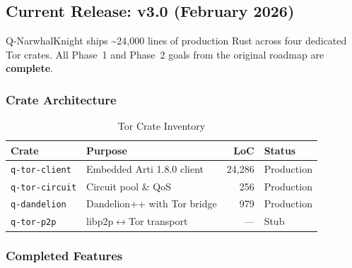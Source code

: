 \documentclass[11pt,a4paper]{article}
\begin{document}
\subsection{Current Release: v3.0 (February 2026)}

Q-NarwhalKnight ships \textasciitilde24,000 lines of production Rust across four dedicated Tor crates. All Phase~1 and Phase~2 goals from the original roadmap are \textbf{complete}.

\subsubsection{Crate Architecture}

\begin{table}[H]
\centering
\caption{Tor Crate Inventory}
\label{tab:crate_inventory}
\begin{tabular}{@{}llrl@{}}
\toprule
\textbf{Crate} & \textbf{Purpose} & \textbf{LoC} & \textbf{Status} \\
\midrule
\texttt{q-tor-client} & Embedded Arti 1.8.0 client & 24,286 & Production \\
\texttt{q-tor-circuit} & Circuit pool \& QoS & 256 & Production \\
\texttt{q-dandelion} & Dandelion++ with Tor bridge & 979 & Production \\
\texttt{q-tor-p2p} & libp2p$\leftrightarrow$Tor transport & --- & Stub \\
\bottomrule
\end{tabular}
\end{table}

\subsubsection{Completed Features}
\end{document}
